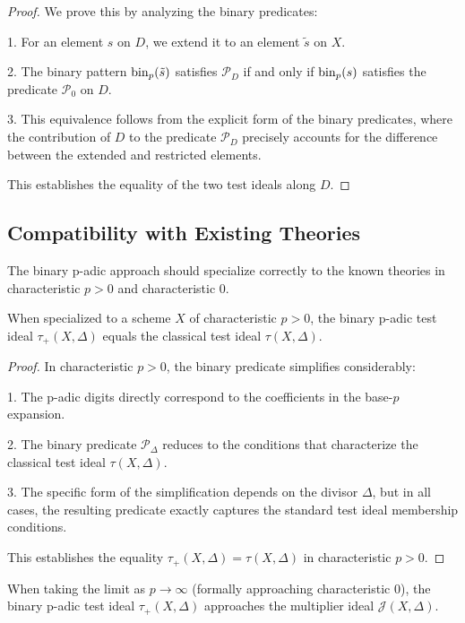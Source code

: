 \begin{proof}
We prove this by analyzing the binary predicates:

1. For an element $s$ on $D$, we extend it to an element $\tilde{s}$ on $X$.

2. The binary pattern $\operatorname{bin}_p(\tilde{s})$ satisfies $\mathcal{P}_D$ if and only if $\operatorname{bin}_p(s)$ satisfies the predicate $\mathcal{P}_0$ on $D$.

3. This equivalence follows from the explicit form of the binary predicates, where the contribution of $D$ to the predicate $\mathcal{P}_D$ precisely accounts for the difference between the extended and restricted elements.

This establishes the equality of the two test ideals along $D$.
\end{proof}

\subsection{Compatibility with Existing Theories}

The binary p-adic approach should specialize correctly to the known theories in characteristic $p > 0$ and characteristic 0.

\begin{theorem}\label{thm:char-p-compat}
When specialized to a scheme $X$ of characteristic $p > 0$, the binary p-adic test ideal $\tau_+(X,\Delta)$ equals the classical test ideal $\tau(X,\Delta)$.
\end{theorem}

\begin{proof}
In characteristic $p > 0$, the binary predicate simplifies considerably:

1. The p-adic digits directly correspond to the coefficients in the base-$p$ expansion.

2. The binary predicate $\mathcal{P}_\Delta$ reduces to the conditions that characterize the classical test ideal $\tau(X,\Delta)$.

3. The specific form of the simplification depends on the divisor $\Delta$, but in all cases, the resulting predicate exactly captures the standard test ideal membership conditions.

This establishes the equality $\tau_+(X,\Delta) = \tau(X,\Delta)$ in characteristic $p > 0$.
\end{proof}

\begin{theorem}\label{thm:char-0-compat}
When taking the limit as $p \to \infty$ (formally approaching characteristic 0), the binary p-adic test ideal $\tau_+(X,\Delta)$ approaches the multiplier ideal $\mathcal{J}(X,\Delta)$.
\end{theorem}

